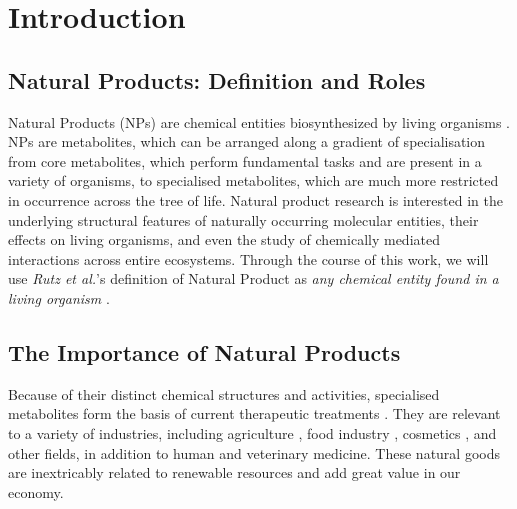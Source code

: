 \documentclass[
11pt, %
oneside, %
english, %
singlespacing, %
headsepline, %
chapterinoneline, %
]{MastersDoctoralThesis} %
\begin{document}



\mainmatter %

\pagestyle{thesis} %


%
% 
%
% 
% 
%

\chapter{Introduction}\label{chap:intro}

\section{Natural Products: Definition and Roles}\label{sec:NP def and roles}
Natural Products (NPs) are chemical entities biosynthesized by living organisms \cite{AllNatural2007}. NPs are metabolites, which can be arranged along a gradient of specialisation from core metabolites, which perform fundamental tasks and are present in a variety of organisms, to specialised metabolites, which are much more restricted in occurrence across the tree of life. Natural product research is interested in the underlying structural features of naturally occurring molecular entities, their effects on living organisms, and even the study of chemically mediated interactions across entire ecosystems. Through the course of this work, we will use \textit{Rutz et al.}'s definition of Natural Product as \textit{ any chemical entity found in a living organism} \cite{rutzLOTUSInitiativeOpen2022}.

\section{The Importance of Natural Products}
Because of their distinct chemical structures and activities, specialised metabolites form the basis of current therapeutic treatments  \cite{harveyReemergenceNaturalProducts2015}. They are relevant to a variety of industries, including agriculture \cite{yanImpactProspectNatural2018}, food industry \cite{gonzalez-manzanoApplicationsNaturalProducts2021}, cosmetics \cite{liuNaturalProductsCosmetics2022}, and other fields, in addition to human and veterinary medicine. These natural goods are inextricably related to renewable resources and add great value in our economy.
\end{document}
